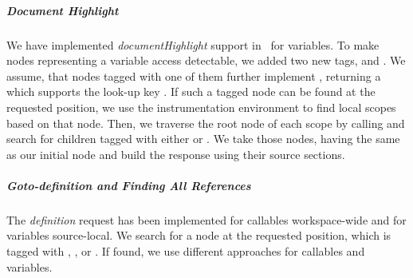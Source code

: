     \subparagraph{Document Highlight}
    We have implemented \emph{documentHighlight} support in \graallsp~for variables. To make nodes representing a variable access detectable, we added two new tags,  and . We assume, that nodes tagged with one of them further implement , returning a  which supports the look-up key . If such a tagged node can be found at the requested position, we use the instrumentation environment to find local scopes based on that node. Then, we traverse the root node of each scope by calling  and search for children tagged with either  or . We take those nodes, having the same  as our initial node and build the response using their source sections.


    \subparagraph{Goto-definition and Finding All References}
    The \emph{definition} request has been implemented for callables workspace-wide and for variables source-local. We search for a node at the requested position, which is tagged with , , or . If found, we use different approaches for callables and variables.

